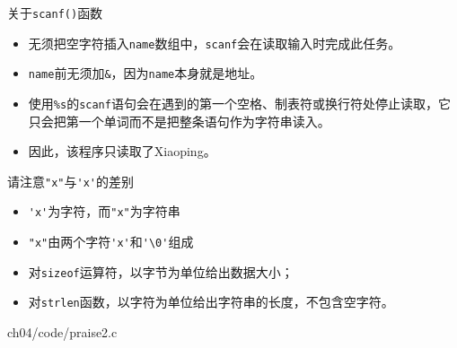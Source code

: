 \begin{frame}[fragile]
关于\lstinline|scanf()|函数

\begin{itemize}
\item 无须把空字符插入\lstinline|name|数组中，\lstinline|scanf|会在读取输入时完成此任务。\\[0.1in]
\item \lstinline|name|前无须加\lstinline|&|，因为\lstinline|name|本身就是地址。\\[0.1in]
\item 使用\lstinline|%s|的\lstinline|scanf|语句会在遇到的第一个空格、制表符或换行符处停止读取，它只会把第一个单词而不是把整条语句作为字符串读入。\\[0.1in]
\item[] 因此，该程序只读取了Xiaoping。

\end{itemize}
\end{frame}

\begin{frame}[fragile]
请注意\lstinline|"x"|与\lstinline|'x'|的差别\vspace{0.1in}

\begin{itemize}
\item \lstinline|'x'|为字符，而\lstinline|"x"|为字符串\\[0.1in]
\item \lstinline|"x"|由两个字符\lstinline|'x'|和\lstinline|'\0'|组成

\end{itemize}
\end{frame}

\begin{frame}[fragile]
\begin{itemize}
\item 对\lstinline|sizeof|运算符，以字节为单位给出数据大小；\\[0.1in]
\item 对\lstinline|strlen|函数，以字符为单位给出字符串的长度，不包含空字符。

\end{itemize}

\end{frame}

\begin{frame}

{
  ch04/code/praise2.c
}
\end{frame}


